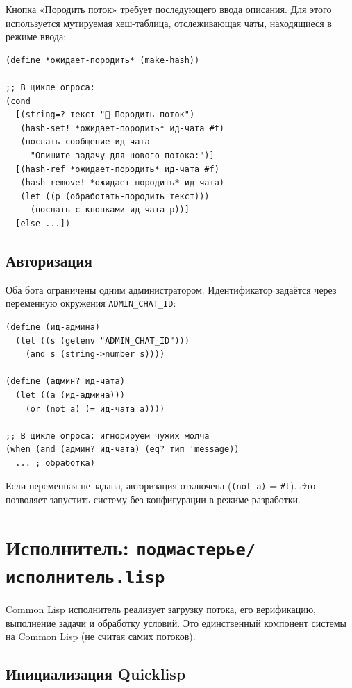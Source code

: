 \documentclass[11pt,a4paper]{article}
\begin{document}
Кнопка «Породить поток» требует последующего ввода описания. Для этого используется
мутируемая хеш-таблица, отслеживающая чаты, находящиеся в режиме ввода:

\begin{lstlisting}[language=Racket, caption={Двухшаговый ввод через состояние}]
(define *ожидает-породить* (make-hash))

;; В цикле опроса:
(cond
  [(string=? текст "🔧 Породить поток")
   (hash-set! *ожидает-породить* ид-чата #t)
   (послать-сообщение ид-чата
     "Опишите задачу для нового потока:")]
  [(hash-ref *ожидает-породить* ид-чата #f)
   (hash-remove! *ожидает-породить* ид-чата)
   (let ((р (обработать-породить текст)))
     (послать-с-кнопками ид-чата р))]
  [else ...])
\end{lstlisting}

\subsection{Авторизация}

Оба бота ограничены одним администратором. Идентификатор задаётся через переменную
окружения \texttt{ADMIN\_CHAT\_ID}:

\begin{lstlisting}[language=Racket, caption={Проверка авторизации}]
(define (ид-админа)
  (let ((s (getenv "ADMIN_CHAT_ID")))
    (and s (string->number s))))

(define (админ? ид-чата)
  (let ((а (ид-админа)))
    (or (not а) (= ид-чата а))))

;; В цикле опроса: игнорируем чужих молча
(when (and (админ? ид-чата) (eq? тип 'message))
  ... ; обработка)
\end{lstlisting}

Если переменная не задана, авторизация отключена (\texttt{(not а)} = \texttt{\#t}).
Это позволяет запустить систему без конфигурации в режиме разработки.

\section{Исполнитель: \texttt{подмастерье/исполнитель.lisp}}

Common Lisp исполнитель реализует загрузку потока, его верификацию,
выполнение задачи и обработку условий. Это единственный компонент системы
на Common Lisp (не считая самих потоков).

\subsection{Инициализация Quicklisp}
\end{document}
